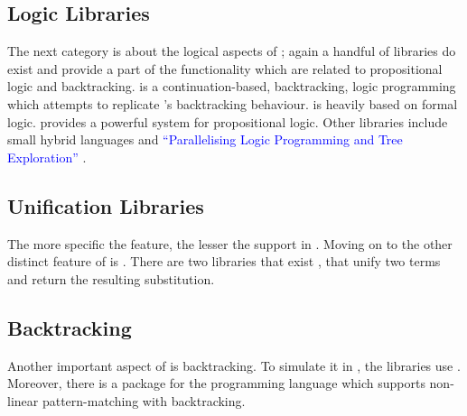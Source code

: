 \documentclass[thesis-solanki.tex]{subfiles}
\begin{document}
\subsection{Logic Libraries}

  The next category is about the logical aspects of ; again a handful of libraries do exist and provide a
  part of the functionality which are related
  to propositional logic and backtracking.
  \cite{logict-lib} is a continuation-based, backtracking, logic programming  which attempts to replicate
  's
  backtracking behaviour.
   is heavily based on formal logic.
  \cite{proplogic-lib} provides a powerful system for propositional logic.
  Other libraries
  include small hybrid languages \cite{cflp-lib} and
  \textcolor{blue}{``Parallelising Logic Programming and Tree Exploration''}
  \cite{logic-grows-on-trees-lib}.


\subsection{Unification Libraries}

The more specific the feature, the lesser the support in .
Moving on to the other distinct feature of  is .
There are two libraries that exist \cite{unification-fd-lib},
\cite{cmu-lib} that unify two  terms and return the resulting
substitution.


\subsection{Backtracking}

Another important aspect of  is backtracking.
To simulate it in , the libraries \cite{stream-monad-lib, logicst-lib} use .
Moreover, there is a package for the  programming language \cite{egison-lib} which supports
non-linear pattern-matching with backtracking.
\end{document}
